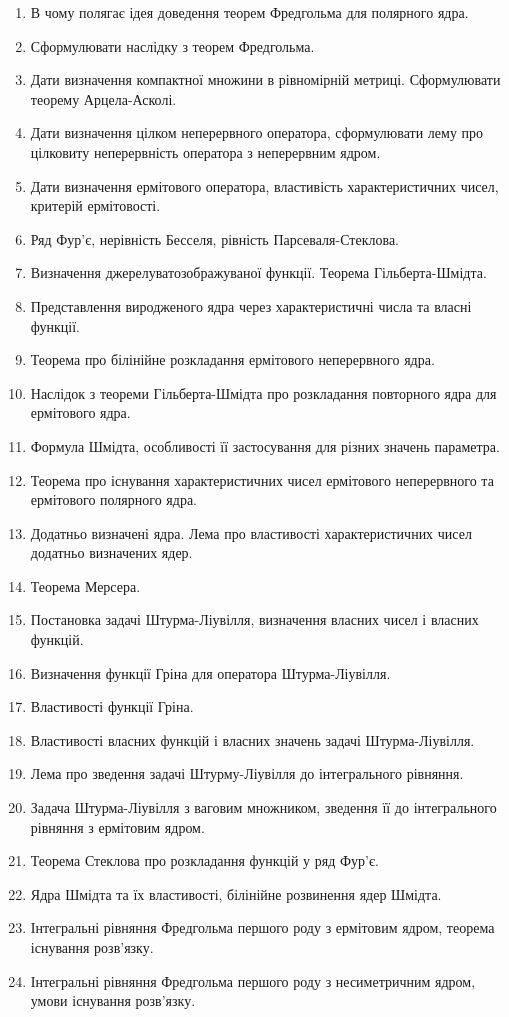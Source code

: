 \begin{enumerate}
	\item В чому полягає ідея доведення теорем Фредгольма для полярного ядра.
	\item Сформулювати наслідку з теорем Фредгольма.
	\item Дати визначення компактної множини в рівномірній метриці. Сформулювати теорему Арцела-Асколі.
	\item Дати визначення цілком неперервного оператора, сформулювати лему про цілковиту неперервність оператора з неперервним ядром.
	\item Дати визначення ермітового оператора, властивість характеристичних чисел, критерій ермітовості.
	\item Ряд Фур'є, нерівність Бесселя, рівність Парсеваля-Стеклова.
	\item Визначення джерелуватозображуваної функції. Теорема Гільберта-Шмідта.
	\item Представлення виродженого ядра через характеристичні числа та власні функції.
	\item Теорема про білінійне розкладання ермітового неперервного ядра.
	\item Наслідок з теореми Гільберта-Шмідта про розкладання повторного ядра для ермітового ядра.
	\item Формула Шмідта, особливості її застосування для різних значень параметра.
	\item Теорема про існування характеристичних чисел ермітового неперервного та ермітового полярного ядра.
	\item Додатньо визначені ядра. Лема про властивості характеристичних чисел додатньо визначених ядер.
	\item Теорема Мерсера.
	\item Постановка задачі Штурма-Ліувілля, визначення власних чисел і власних функцій.
	\item Визначення функції Гріна для оператора Штурма-Ліувілля.
	\item Властивості функції Гріна.
	\item Властивості власних функцій і власних значень задачі Штурма-Ліувілля.
	\item Лема про зведення задачі Штурму-Ліувілля до інтегрального рівняння.
	\item Задача Штурма-Ліувілля з ваговим множником, зведення її до інтегрального рівняння з ермітовим ядром.
	\item Теорема Стеклова про розкладання функцій у ряд Фур'є.
	\item Ядра Шмідта та їх властивості, білінійне розвинення ядер Шмідта.
	\item Інтегральні рівняння Фредгольма першого роду з ермітовим ядром, теорема існування розв'язку.
	\item Інтегральні рівняння Фредгольма першого роду з несиметричним ядром, умови існування розв'язку.
\end{enumerate}

